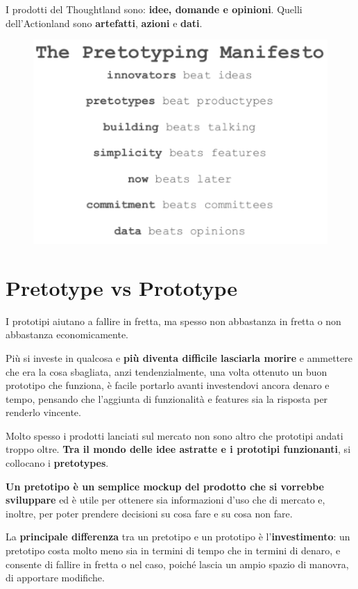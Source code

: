 \documentclass[a4paper,11pt,oneside]{book}
\begin{document}
I prodotti del Thoughtland sono: \textbf{idee, domande e opinioni}. Quelli dell'Actionland sono \textbf{artefatti}, \textbf{azioni} e \textbf{dati}.

\begin{figure}[!h]
	\centering
	\includegraphics[scale=0.6]{immagini/Manifesto.png}
\end{figure}

\section{Pretotype vs Prototype}
I prototipi aiutano a fallire in fretta, ma spesso non abbastanza in fretta o non abbastanza economicamente.

Più si investe in qualcosa e \textbf{più diventa difficile lasciarla morire} e ammettere che era la cosa sbagliata, anzi tendenzialmente, una volta ottenuto un buon prototipo che funziona, è facile portarlo avanti investendovi ancora denaro e tempo, pensando che l'aggiunta di funzionalità e features sia la risposta per renderlo vincente.

Molto spesso i prodotti lanciati sul mercato non sono altro che prototipi andati troppo oltre. \textbf{Tra il mondo delle idee astratte e i prototipi funzionanti}, si collocano i \textbf{pretotypes}.

\textbf{Un pretotipo è un semplice mockup del prodotto che si vorrebbe sviluppare} ed è utile per ottenere sia informazioni d'uso che di mercato e, inoltre, per poter prendere decisioni su cosa fare e su cosa non fare.

La \textbf{principale differenza} tra un pretotipo e un prototipo è l'\textbf{investimento}: un pretotipo costa molto meno sia in termini di tempo che in termini di denaro, e consente di fallire in fretta o nel caso, poiché lascia un ampio spazio di manovra, di apportare modifiche.
\end{document}
